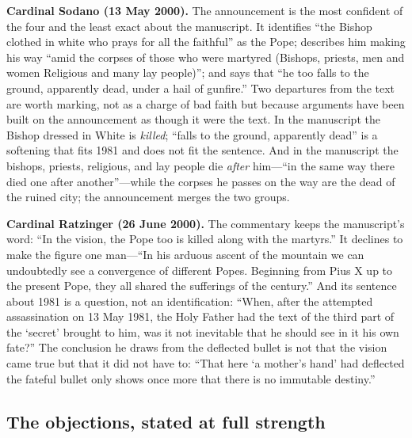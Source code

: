 \textbf{Cardinal Sodano (13 May 2000).} The announcement is the most
confident of the four and the least exact about the manuscript. It
identifies ``the Bishop clothed in white who prays for all the
faithful'' as the Pope; describes him making his way ``amid the
corpses of those who were martyred (Bishops, priests, men and women
Religious and many lay people)''; and says that ``he too falls to the
ground, apparently dead, under a hail of gunfire.'' Two departures
from the text are worth marking, not as a charge of bad faith but
because arguments have been built on the announcement as though it
were the text. In the manuscript the Bishop dressed in White is
\emph{killed}; ``falls to the ground, apparently dead'' is a
softening that fits 1981 and does not fit the sentence. And in the
manuscript the bishops, priests, religious, and lay people die
\emph{after} him---``in the same way there died one after
another''---while the corpses he passes on the way are the dead of
the ruined city; the announcement merges the two groups.

\textbf{Cardinal Ratzinger (26 June 2000).} The commentary keeps the
manuscript's word: ``In the vision, the Pope too is killed along with
the martyrs.'' It declines to make the figure one man---``In his
arduous ascent of the mountain we can undoubtedly see a convergence
of different Popes. Beginning from Pius X up to the present Pope,
they all shared the sufferings of the century.'' And its sentence
about 1981 is a question, not an identification: ``When, after the
attempted assassination on 13 May 1981, the Holy Father had the text
of the third part of the `secret' brought to him, was it not
inevitable that he should see in it his own fate?'' The conclusion he
draws from the deflected bullet is not that the vision came true but
that it did not have to: ``That here `a mother's hand' had deflected
the fateful bullet only shows once more that there is no immutable
destiny.''

\subsection{The objections, stated at full strength}

